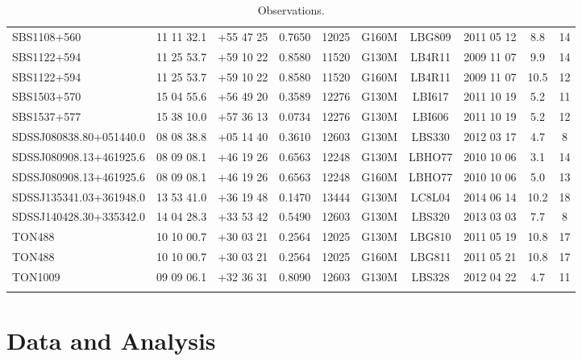 \documentclass[iop]{emulateapj-rtx4}
\begin{document}
\begin{table}[ht]
\begin{center}
\begin{tabular}{l c c c c c c c c c}
 SBS1108+560 			         & 11 11 32.1  &  +55 47 25  &  0.7650  & 12025 & G160M     & LBG809  & 2011 05 12   &     8.8 & 14  \\
 SBS1122+594 			        & 11 25 53.7  &  +59 10 22   &  0.8580 & 11520	& G130M      & LB4R11  & 2009 11 07  &     9.9 &  14  \\
 SBS1122+594 			        & 11 25 53.7  &  +59 10 22   &  0.8580 & 11520	& G160M      & LB4R11  & 2009 11 07  &   10.5 &  12  \\
 SBS1503+570 			& 15 04 55.6  &  +56 49 20  &  0.3589  & 12276 & G130M     & LBI617     & 2011 10 19  &   5.2 & 11  \\
 SBS1537+577 			& 15 38 10.0  &  +57 36 13  &  0.0734  & 12276 & G130M     & LBI606     & 2011 10 19  &   5.2 &  12  \\
 SDSSJ080838.80+051440.0 	& 08 08 38.8  &  +05 14 40  &  0.3610  & 12603 & G130M     & LBS330   & 2012 03 17  &    4.7 &  8  \\
 SDSSJ080908.13+461925.6 	& 08 09 08.1  &  +46 19 26  &  0.6563 & 12248	 & G130M     & LBHO77  & 2010 10 06   &    3.1 &  14  \\
 SDSSJ080908.13+461925.6 	& 08 09 08.1  &  +46 19 26  &  0.6563 & 12248	 & G160M     & LBHO77  & 2010 10 06   &    5.0 &  13  \\
 SDSSJ135341.03+361948.0 	& 13 53 41.0  &  +36 19 48  &  0.1470  & 13444 & G130M     & LC8L04   & 2014 06 14  &   10.2 &  18  \\
 SDSSJ140428.30+335342.0 	& 14 04 28.3  &  +33 53 42 &  0.5490  & 12603	 & G130M     & LBS320   & 2013 03 03   &     7.7 &  8  \\
 TON488 					& 10 10 00.7  &  +30 03 21  &  0.2564  & 12025 & G130M     & LBG810   & 2011 05 19  &  10.8  &  17  \\
 TON488 					& 10 10 00.7  &  +30 03 21  &  0.2564  & 12025 & G160M     & LBG811   & 2011 05  21 &  10.8  &  17  \\
 TON1009 				& 09 09 06.1  &  +32 36 31  &  0.8090 & 12603  & G130M     & LBS328   & 2012 04 22   &    4.7 &  11  \\

 \\
\hline

\end{tabular}
\end{center}
  \caption{\small{Observations.}}
  \label{target_table}
\end{table}


\section{Data and Analysis}
\end{document}
